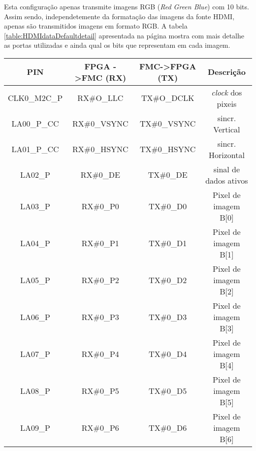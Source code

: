 Esta configuração apenas transmite imagens RGB (\textit{Red Green Blue}) com 10 bits. Assim sendo, independetemente da formatação das imagens da fonte HDMI, apenas são transmitidos imagens em formato RGB. A tabela \ref{table:HDMIdataDefaultdetail} apresentada na página \pageref{table:HDMIdataDefaultdetail} mostra com  mais detalhe as portas utilizadas e ainda qual os bits que representam em cada imagem. 


\begin{table}[h!]
	\centering
	\begin{tabular}{|c|c|c|c|}
		\hline
		\textbf{PIN} & \textbf{FPGA -\textgreater FMC (RX)} & \textbf{FMC->FPGA (TX)} & \textbf{Descrição}       \\ \hline
		CLK0\_M2C\_P & RX\#O\_LLC                           & TX\#O\_DCLK                        & \textit{clock} dos pixeis         \\ \hline
		LA00\_P\_CC  & RX\#0\_VSYNC                         & TX\#0\_VSYNC                       & sincr. Vertical          \\ \hline
		LA01\_P\_CC  & RX\#0\_HSYNC                         & TX\#0\_HSYNC                       & sincr. Horizontal        \\ \hline
		LA02\_P      & RX\#0\_DE                            & TX\#0\_DE                          & sinal de dados ativos    \\ \hline
		LA03\_P      & RX\#0\_P0                            & TX\#0\_D0                          & Pixel de imagem B{[}0{]} \\ \hline
		LA04\_P      & RX\#0\_P1                            & TX\#0\_D1                          & Pixel de imagem B{[}1{]} \\ \hline
		LA05\_P      & RX\#0\_P2                            & TX\#0\_D2                          & Pixel de imagem B{[}2{]} \\ \hline
		LA06\_P      & RX\#0\_P3                            & TX\#0\_D3                          & Pixel de imagem B{[}3{]} \\ \hline
		LA07\_P      & RX\#0\_P4                            & TX\#0\_D4                          & Pixel de imagem B{[}4{]} \\ \hline
		LA08\_P      & RX\#0\_P5                            & TX\#0\_D5                          & Pixel de imagem B{[}5{]} \\ \hline
		LA09\_P      & RX\#0\_P6                            & TX\#0\_D6                          & Pixel de imagem B{[}6{]} \\ \hline

\end{tabular}
\end{table}

